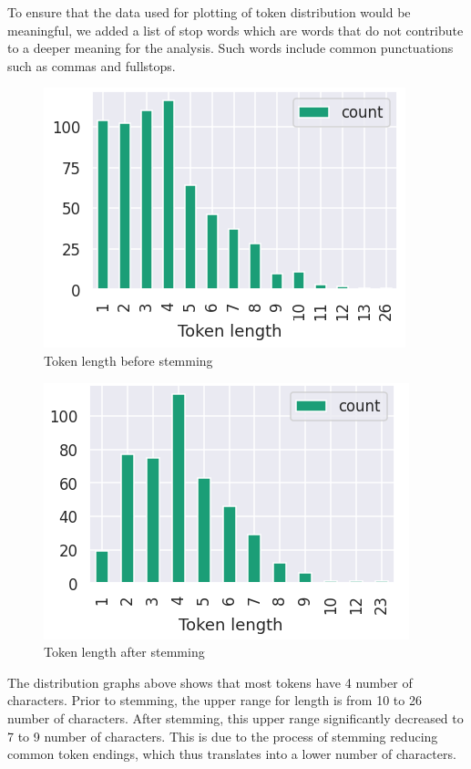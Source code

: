 \documentclass[sigconf,nonacm=true]{acmart}
\begin{document}
To ensure that the data used for plotting of token distribution would be meaningful, we added a list of stop words which are words that do not contribute to a deeper meaning for the analysis. Such words include common punctuations such as commas and fullstops. \linebreak
\begin{figure}
	\centering
	\includegraphics[scale=0.55]{ss1.png}
	\caption{Token length before stemming}
\end{figure}


\begin{figure}[H]
    \centering
    \includegraphics[scale=0.55]{ss2.png}
   	\caption{Token length after stemming}
\end{figure}
The distribution graphs above shows that most tokens have 4 number of characters. Prior to stemming, the upper range for length is from 10 to 26 number of characters. After stemming, this upper range significantly decreased to 7 to 9 number of characters. This is due to the process of stemming reducing common token endings, which thus translates into a lower number of characters. 
\end{document}
